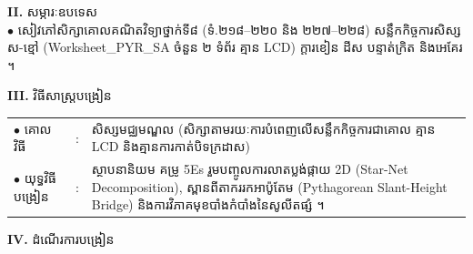 \documentclass[a4paper,10pt]{article}
\newcommand{\en}[1]{{\TimesEn #1}}
\begin{document}
{\vspace{2pt}

\textbf{II.} {\muol សម្ភារៈឧបទេស}\\[1pt]
\hspace*{0.55cm}$\bullet$ \hspace{0.35cm} សៀវភៅសិក្សាគោលគណិតវិទ្យាថ្នាក់ទី៨ (ទំ.២១៨--២២០ និង ២២៧--២២៨) សន្លឹកកិច្ចការសិស្ស ស-ខ្មៅ (\en{Worksheet\_PYR\_SA} ចំនួន ២ ទំព័រ គ្មាន \en{LCD}) ក្ដារខៀន ដីស បន្ទាត់ក្រិត និងអេគែរ ។

\vspace{2pt}

\textbf{III.} {\muol វិធីសាស្រ្តបង្រៀន}\\[1pt]
\hspace*{0.45cm}%
\begin{tabular}{@{}l l L{14.85cm}@{}}
  $\bullet$ \hspace{0.25cm} គោលវិធី & : & សិស្សមជ្ឈមណ្ឌល (សិក្សាតាមរយៈការបំពេញលើសន្លឹកកិច្ចការជាគោល គ្មាន \en{LCD} និងគ្មានការកាត់បិទក្រដាស) \\
  $\bullet$ \hspace{0.25cm} យុទ្ធវិធីបង្រៀន & : & ស្ថាបនានិយម គម្រូ \en{5Es} រួមបញ្ចូលការលាតប្លង់ផ្កាយ \en{2D} (\en{Star-Net Decomposition}), ស្ពានពីតាកររកអាប៉ូតែម (\en{Pythagorean Slant-Height Bridge}) និងការវិភាគមុខបាំងកំបាំងនៃសូលីតផ្សំ ។ \\
\end{tabular}
}

\vspace{2pt}

\textbf{IV.} {\muol ដំណើរការបង្រៀន}

\vspace{1pt}
\end{document}
